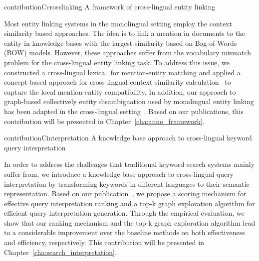 \begin{restatable}{contribution}{Ccrosslinking} \label{c:crosslinking}
A framework of cross-lingual entity linking
\end{restatable}
\vspace{-0.9em}
\noindent Most entity linking systems in the monolingual setting employ the context similarity based approaches. The idea is to link a mention in documents to the entity in knowledge bases with the largest similarity based on Bag-of-Words (BOW) models. However, these approaches suffer from the vocabulary mismatch problem for the cross-lingual entity linking task.  
To address this issue, we constructed a cross-lingual lexica~\cite{} for mention-entity matching and applied a concept-based approach for cross-lingual context similarity calculation~\cite{} to capture the local mention-entity compatibility. In addition, our approach to graph-based collectively entity disambiguation used by monolingual entity linking has been adapted in the cross-lingual setting~\cite{}. Based on our publications, this contribution will be presented in Chapter~\ref{cha:anno_framework}.

\begin{restatable}{contribution}{Cinterpretation} \label{c:interpretation}
A knowledge base approach to cross-lingual keyword query interpretation
\end{restatable}
\vspace{-0.9em}
\noindent In order to address the challenges that traditional keyword search systems mainly suffer from, we introduce a knowledge base approach to cross-lingual query interpretation by transforming keywords in different languages to their semantic representation. Based on our publication~\cite{}, we propose a scoring mechanism for effective query interpretation ranking and a top-k graph exploration algorithm for efficient query interpretation generation. Through the empirical evaluation, we show that our ranking mechanism and the top-k graph exploration algorithm lead to a considerable improvement over the baseline methods on both effectiveness and efficiency, respectively. This contribution will be presented in Chapter~\ref{cha:search_interpretation}.

